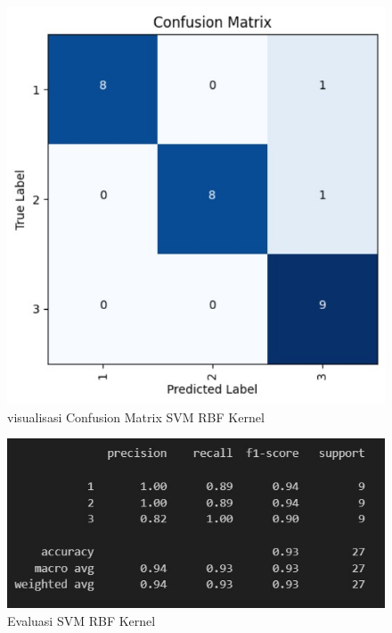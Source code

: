 \begin{figure} [H] \centering
  \includegraphics[scale=0.65]{gambar/cfprbf.jpg}
  \caption{visualisasi Confusion Matrix SVM RBF Kernel}
  \label{fig:evalconfpRBF}
\end{figure}


\begin{figure} [H] \centering
  \includegraphics[scale=0.65]{gambar/evalrbf.jpg}
  \caption{Evaluasi SVM RBF Kernel}
  \label{fig:evalRBF}
\end{figure}

